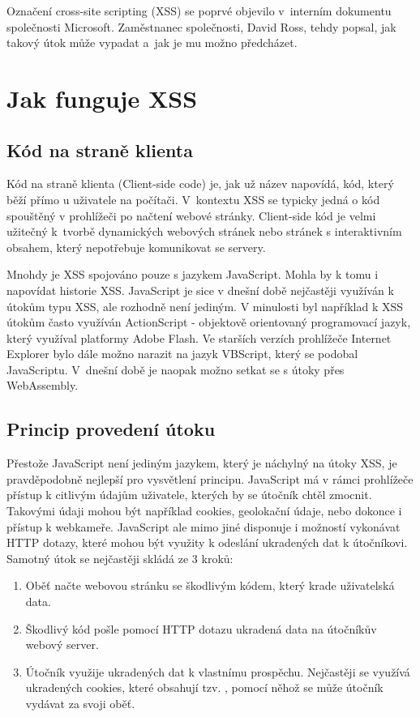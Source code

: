 \documentclass[11pt,conference, a4paper]{IEEEtran}
\begin{document}
Označení cross-site scripting (XSS) se poprvé objevilo  v~interním dokumentu  společnosti Microsoft. Zaměstnanec společnosti, David Ross, tehdy popsal, jak takový útok může vypadat a~jak je mu možno předcházet.~\cite{Grossman2007}


\section{Jak funguje XSS}
\subsection{Kód na straně klienta}
Kód na straně klienta (Client-side code) je, jak už název napovídá, kód, který běží přímo u uživatele na počítači. V~kontextu XSS se typicky jedná o kód spouštěný v prohlížeči po načtení webové stránky. Client-side kód je velmi užitečný k~tvorbě dynamických webových stránek nebo stránek s interaktivním obsahem, který nepotřebuje komunikovat se servery.~\cite{XSS-cloudflare}

Mnohdy je XSS spojováno pouze s jazykem JavaScript. Mohla by k tomu i napovídat historie XSS. JavaScript je sice v dnešní době nejčastěji využíván k útokům typu XSS, ale rozhodně není jediným. V minulosti byl například k XSS útokům často využíván ActionScript - objektově orientovaný programovací jazyk, který využíval platformy Adobe Flash. Ve starších verzích prohlížeče Internet Explorer bylo dále možno narazit na jazyk VBScript, který se podobal JavaScriptu. V~dnešní době je naopak možno setkat se s útoky přes WebAssembly.

\subsection{Princip provedení útoku}
Přestože JavaScript není jediným jazykem, který je náchylný na útoky XSS, je pravděpodobně nejlepší pro vysvětlení principu. JavaScript má v rámci prohlížeče přístup k citlivým údajům uživatele, kterých by se útočník chtěl zmocnit. Takovými údaji mohou být například cookies, geolokační údaje, nebo dokonce i přístup k webkameře. JavaScript ale mimo jiné disponuje i možností vykonávat HTTP dotazy, které mohou být využity k odeslání ukradených dat k útočníkovi. Samotný útok se nejčastěji skládá ze 3 kroků:
\begin{enumerate}
    \item Oběť načte webovou stránku se škodlivým kódem, který krade uživatelská data.
    
    \item Škodlivý kód pošle pomocí HTTP dotazu ukradená data na útočníkův webový server.

    \item Útočník využije ukradených dat k vlastnímu prospěchu. Nejčastěji se využívá ukradených cookies, které obsahují tzv. , pomocí něhož se může útočník vydávat za svoji oběť.~\cite{XSS-cloudflare}
    
\end{enumerate}
\end{document}
